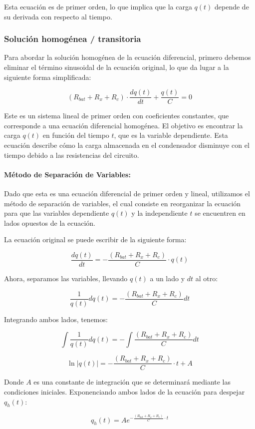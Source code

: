 Esta ecuación es de primer orden, lo que implica que la carga \(q(t)\) depende de su derivada
con respecto al tiempo.

\subsubsection*{Solución homogénea / transitoria}
Para abordar la solución homogénea de la ecuación diferencial, primero debemos eliminar el
término sinusoidal de la ecuación original, lo que da lugar a la siguiente forma simplificada:

\[
    (R_{bat} + R_x + R_c) \cdot \frac{dq(t)}{dt} + \frac{q(t)}{C} = 0
\]

Este es un sistema lineal de primer orden con coeficientes constantes, que corresponde a una
ecuación diferencial homogénea. El objetivo es encontrar la carga \(q(t)\) en función del tiempo
\(t\), que es la variable dependiente. Esta ecuación describe cómo la carga almacenada en el
condensador disminuye con el tiempo debido a las resistencias del circuito.

\paragraph*{Método de Separación de Variables:}
Dado que esta es una ecuación diferencial de primer orden y lineal, utilizamos el
método de separación de variables, el cual consiste en reorganizar la ecuación para
que las variables dependiente \(q(t)\) y la independiente \(t\) se encuentren en lados
opuestos de la ecuación.

La ecuación original se puede escribir de la siguiente forma:

\[
    \frac{dq(t)}{dt} = -\frac{(R_{bat} + R_x + R_c)}{C} \cdot q(t)
\]

Ahora, separamos las variables, llevando \(q(t)\) a un lado y \(dt\) al otro:

\[
    \frac{1}{q(t)} dq(t) = -\frac{(R_{bat} + R_x + R_c)}{C} dt
\]

Integrando ambos lados, tenemos:

\[
    \int \frac{1}{q(t)} dq(t) = -\int \frac{(R_{bat} + R_x + R_c)}{C} dt
\]

\[
    \ln |q(t)| = -\frac{(R_{bat} + R_x + R_c)}{C} \cdot t  + A
\]

Donde \(A\) es una constante de integración que se determinará mediante las condiciones
iniciales. Exponenciando ambos lados de la ecuación para despejar \(q_h(t)\):

\[
    q_h(t) = Ae^{-\frac{(R_{bat} + R_x + R_c)}{C} \cdot t}
\]

